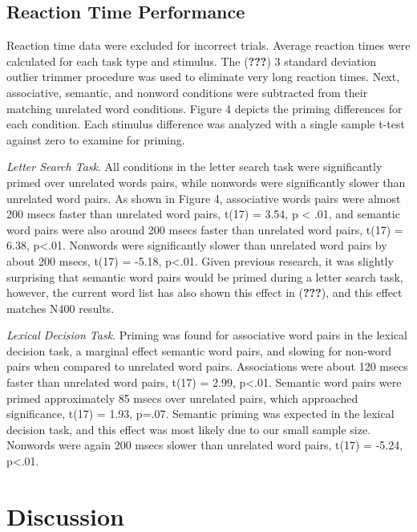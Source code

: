 \documentclass[english,man]{apa6}
\theoremstyle{definition}
\theoremstyle{definition}
\theoremstyle{definition}
\theoremstyle{remark}
\begin{document}
\subsection{Reaction Time Performance}\label{reaction-time-performance}

Reaction time data were excluded for incorrect trials. Average reaction
times were calculated for each task type and stimulus. The
({\textbf{???}}) 3 standard deviation outlier trimmer procedure was used
to eliminate very long reaction times. Next, associative, semantic, and
nonword conditions were subtracted from their matching unrelated word
conditions. Figure 4 depicts the priming differences for each condition.
Each stimulus difference was analyzed with a single sample t-test
against zero to examine for priming.

\emph{Letter Search Task}. All conditions in the letter search task were
significantly primed over unrelated words pairs, while nonwords were
significantly slower than unrelated word pairs. As shown in Figure 4,
associative words pairs were almost 200 msecs faster than unrelated word
pairs, t(17) = 3.54, p \textless{} .01, and semantic word pairs were
also around 200 msecs faster than unrelated word pairs, t(17) = 6.38,
p\textless{}.01. Nonwords were significantly slower than unrelated word
pairs by about 200 msecs, t(17) = -5.18, p\textless{}.01. Given previous
research, it was slightly surprising that semantic word pairs would be
primed during a letter search task, however, the current word list has
also shown this effect in ({\textbf{???}}), and this effect matches N400
results.

\emph{Lexical Decision Task}. Priming was found for associative word
pairs in the lexical decision task, a marginal effect semantic word
pairs, and slowing for non-word pairs when compared to unrelated word
pairs. Associations were about 120 msecs faster than unrelated word
pairs, t(17) = 2.99, p\textless{}.01. Semantic word pairs were primed
approximately 85 msecs over unrelated pairs, which approached
significance, t(17) = 1.93, p=.07. Semantic priming was expected in the
lexical decision task, and this effect was most likely due to our small
sample size. Nonwords were again 200 msecs slower than unrelated word
pairs, t(17) = -5.24, p\textless{}.01.

\section{Discussion}\label{discussion}
\end{document}
